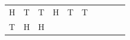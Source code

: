 {\begin{tabular}[t]{|l|l|l|l|l|l|l|l|l|l|}
        H &
    
    
        T &
    
    
        T &
    
    
        H &
    
    
        T &
    
    
        T%
     \tabularnewline\cline{1-1}\cline{2-2}\cline{3-3}\cline{4-4}\cline{5-5}\cline{6-6}\cline{7-7}\cline{8-8}\cline{9-9}\cline{10-10}
    
    
        T &
    
    
        H &
    
    
        H &
    

\end{tabular}}
